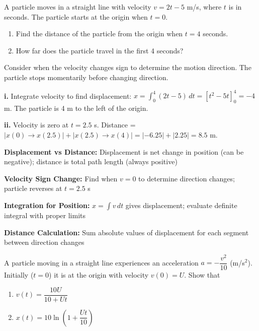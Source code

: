 
\begin{problem}
A particle moves in a straight line with velocity $v = 2t - 5$ m/s, where $t$ is in seconds. The particle starts at the origin when $t = 0$.

\begin{enumerate}[label=\textbf{\roman*.}]
    \item Find the distance of the particle from the origin when $t = 4$ seconds.
    \item How far does the particle travel in the first 4 seconds?
\end{enumerate}
\end{problem}

\begin{hint}
Consider when the velocity changes sign to determine the motion direction. The particle stops momentarily before changing direction.
\end{hint}

\begin{solution}
\textbf{i.} Integrate velocity to find displacement: $x = \int_0^4 (2t-5)\,dt = [t^2 - 5t]_0^4 = -4$ m. The particle is 4 m to the left of the origin.

\textbf{ii.} Velocity is zero at $t = 2.5$ s. Distance = $|x(0) \to x(2.5)| + |x(2.5) \to x(4)| = |-6.25| + |2.25| = 8.5$ m.
\end{solution}

\begin{takeaways}
\item \textbf{Displacement vs Distance:} Displacement is net change in position (can be negative); distance is total path length (always positive)
\item \textbf{Velocity Sign Change:} Find when $v = 0$ to determine direction changes; particle reverses at $t = 2.5$ s
\item \textbf{Integration for Position:} $x = \int v\,dt$ gives displacement; evaluate definite integral with proper limits
\item \textbf{Distance Calculation:} Sum absolute values of displacement for each segment between direction changes
\end{takeaways}

\begin{problem}
A particle moving in a straight line experiences an acceleration $a = -\dfrac{v^2}{10}$ (m/s$^2$). Initially ($t=0$) it is at the origin with velocity $v(0)=U$. Show that
\begin{enumerate}[label=\textbf{\alph*.}]
    \item $v(t)=\dfrac{10U}{10+Ut}$
    \item $x(t)=10\ln\left(1+\dfrac{Ut}{10}\right)$
\end{enumerate}
\end{problem}

